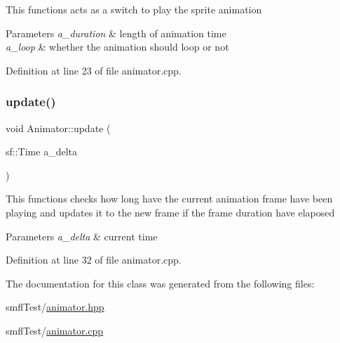 This functions acts as a switch to play the sprite animation


\begin{DoxyParams}{Parameters}
{\em a\+\_\+duration} & length of animation time \\
\hline
{\em a\+\_\+loop} & whether the animation should loop or not \\
\hline
\end{DoxyParams}


Definition at line 23 of file animator.\+cpp.

\mbox{\label{class_animator_a79c476575fc1e1c50e8f119be6806cf0}} 
\subsubsection{\texorpdfstring{update()}{update()}}
{\footnotesize\ttfamily void Animator\+::update (\begin{DoxyParamCaption}\item[{sf\+::\+Time}]{a\+\_\+delta }\end{DoxyParamCaption})}

This functions checks how long have the current animation frame have been playing and updates it to the new frame if the frame duration have elaposed


\begin{DoxyParams}{Parameters}
{\em a\+\_\+delta} & current time \\
\hline
\end{DoxyParams}


Definition at line 32 of file animator.\+cpp.



The documentation for this class was generated from the following files\+:\begin{DoxyCompactItemize}
\item 
smfl\+Test/\hyperlink{animator_8hpp}{animator.\+hpp}\item 
smfl\+Test/\hyperlink{animator_8cpp}{animator.\+cpp}\end{DoxyCompactItemize}
